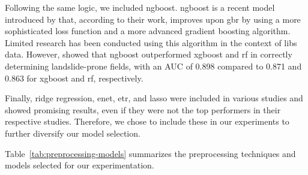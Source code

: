 Following the same logic, we included \gls{ngboost}. 
\gls{ngboost} is a recent model introduced by \citet{duan_ngboost_2020} that, according to their work, improves upon \gls{gbr} by using a more sophisticated loss function and a more advanced gradient boosting algorithm.
Limited research has been conducted using this algorithm in the context of \gls{libs} data. 
However, \citet{ngboost_landslide} showed that \gls{ngboost} outperformed \gls{xgboost} and \gls{rf} in correctly determining landslide-prone fields, with an AUC of 0.898 compared to 0.871 and 0.863 for \gls{xgboost} and \gls{rf}, respectively.

Finally, ridge regression, \gls{enet}, \gls{etr}, and \gls{lasso} were included in various studies and showed promising results, even if they were not the top performers in their respective studies.
Therefore, we chose to include these in our experiments to further diversify our model selection. 

Table~\ref{tab:preprocessing-models} summarizes the preprocessing techniques and models selected for our experimentation.

